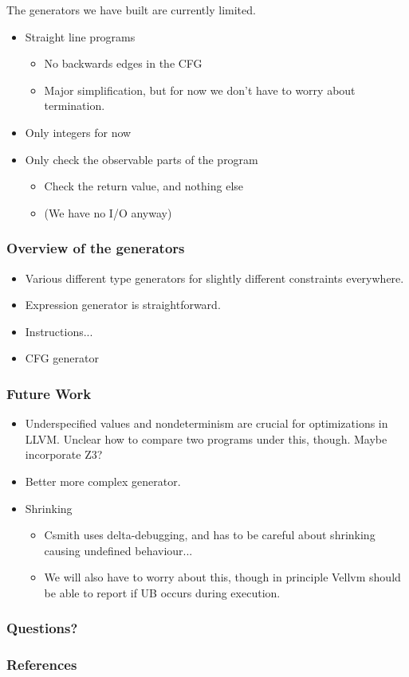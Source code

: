 \documentclass{beamer}
\begin{document}
\begin{frame}
  The generators we have built are currently limited.

  \begin{itemize}
  \item Straight line programs
    \begin{itemize}
    \item No backwards edges in the CFG
    \item Major simplification, but for now we don't have to worry
      about termination.
    \end{itemize}
  \item Only integers for now
  \item Only check the observable parts of the program
    \begin{itemize}
    \item Check the return value, and nothing else
    \item (We have no I/O anyway)
    \end{itemize}
  \end{itemize}
\end{frame}

\begin{frame}
  \frametitle{Overview of the generators}

  \begin{itemize}
  \item Various different type generators for slightly different
    constraints everywhere.
  \item Expression generator is straightforward.
  \item Instructions...
  \item CFG generator
  \end{itemize}

\end{frame}

\begin{frame}
  \frametitle{Future Work}

  \begin{itemize}
  \item Underspecified values and nondeterminism are crucial for
    optimizations in LLVM. Unclear how to compare two programs under
    this, though. Maybe incorporate Z3?
  \item Better more complex generator.
  \item Shrinking
    \begin{itemize}
    \item Csmith uses delta-debugging, and has to be careful about
      shrinking causing undefined behaviour...
    \item We will also have to worry about this, though in principle
      Vellvm should be able to report if UB occurs during execution.
    \end{itemize}
  \end{itemize}

\end{frame}

\begin{frame}
  \frametitle{Questions?}

\end{frame}

\begin{frame}
  \frametitle{References}

  \nocite{*}
  \printbibliography
\end{frame}
\end{document}
